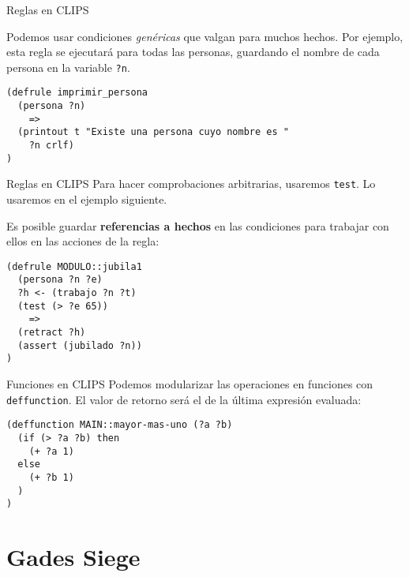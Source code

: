 \documentclass[smaller,spanish,xcolor=svgnames]{beamer}
\begin{document}
\begin{frame}[fragile]{Reglas en CLIPS}

Podemos usar condiciones \textit{genéricas} que valgan para muchos
hechos. Por ejemplo, esta regla se ejecutará para todas las personas, guardando
el nombre de cada persona en la variable \texttt{?n}.

\begin{verbatim}
(defrule imprimir_persona
  (persona ?n)
    =>
  (printout t "Existe una persona cuyo nombre es " 
    ?n crlf)
)
\end{verbatim}
\end{frame}

\begin{frame}[fragile]{Reglas en CLIPS}
  Para hacer comprobaciones arbitrarias, usaremos \texttt{test}. Lo usaremos en
  el ejemplo siguiente.

  \medskip

  Es posible guardar \textbf{referencias a hechos} en las condiciones para trabajar con
  ellos en las acciones de la regla:

\begin{verbatim}
(defrule MODULO::jubila1
  (persona ?n ?e)
  ?h <- (trabajo ?n ?t)
  (test (> ?e 65))
    =>
  (retract ?h)
  (assert (jubilado ?n))
)
\end{verbatim}  
\end{frame}

\begin{frame}[fragile]{Funciones en CLIPS}
  Podemos modularizar las operaciones en funciones con \texttt{deffunction}. El
  valor de retorno será el de la última expresión evaluada:

\begin{verbatim}
(deffunction MAIN::mayor-mas-uno (?a ?b)
  (if (> ?a ?b) then
    (+ ?a 1)
  else
    (+ ?b 1)
  )
)
\end{verbatim}
\end{frame}


\section{Gades Siege}
\end{document}
